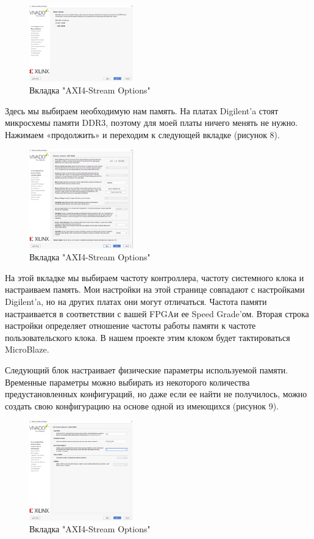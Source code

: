\documentclass[a4paper,oneside ,14pt]{extreport}
\begin{document}
\begin{figure}[h]
	\centering
	\includegraphics[width=0.4\textwidth]{image/mig_3.png}
	\caption{Вкладка "AXI4-Stream Options"}
	\label{cordic_axi4_stream_options}
\end{figure}

Здесь мы выбираем необходимую нам память. На платах Digilent’a стоят микросхемы памяти DDR3, поэтому для моей платы ничего менять не нужно. Нажимаем «продолжить» и переходим к следующей вкладке (рисунок 8).

\begin{figure}[h]
	\centering
	\includegraphics[width=0.4\textwidth]{image/mig_4.png}
	\caption{Вкладка "AXI4-Stream Options"}
	\label{cordic_axi4_stream_options}
\end{figure}

На этой вкладке мы выбираем частоту контроллера, частоту системного клока и настраиваем память. Мои настройки на этой странице совпадают с настройками Digilent’a, но на других платах они могут отличаться. Частота памяти настраивается в соответствии с вашей FPGAи ее Speed Grade’ом. Вторая строка настройки определяет отношение частоты работы памяти к частоте пользовательского клока. В нашем проекте этим клоком будет тактироваться MicroBlaze.

Следующий блок настраивает физические параметры используемой памяти. Временные параметры можно выбирать из некоторого количества предустановленных конфигураций, но даже если ее найти не получилось, можно создать свою конфигурацию на основе одной из имеющихся (рисунок 9).

\begin{figure}[h]
	\centering
	\includegraphics[width=0.4\textwidth]{image/mig_5.png}
	\caption{Вкладка "AXI4-Stream Options"}
	\label{cordic_axi4_stream_options}
\end{figure}
\end{document}
